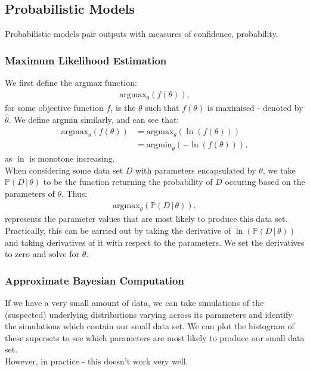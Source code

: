 \newpage

\subsection{Probabilistic Models}

Probabilistic models pair outputs with measures of confidence,
probability.

\subsubsection{Maximum Likelihood Estimation}

We first define the argmax function:
\begin{gather*}
    \text{argmax}_\theta(f(\theta)),
\end{gather*} for some objective function $f$, is the $\theta$
such that $f(\theta)$ is maximised - denoted by $\hat\theta$.
We define argmin similarly, and can see that:
\begin{align*}
    \text{argmax}_\theta(f(\theta)) 
    &= \text{argmax}_\theta(\ln(f(\theta))) \\
    &= \text{argmin}_\theta(-\ln(f(\theta))),
\end{align*} as $\ln$ is monotone increasing.
\\[\baselineskip]
When considering some data set $D$ with parameters
encapsulated by $\theta$, we take $\mathbb{P}(D \, | \, \theta)$ 
to be the function returning the probability of $D$ occuring based 
on the parameters of $\theta$. Thus: \begin{gather*}
    \text{argmax}_\theta(\mathbb{P}(D \, | \, \theta)),
\end{gather*} represents the parameter values that
are most likely to produce this data set. Practically,
this can be carried out by taking the derivative of
$\ln(\mathbb{P}(D \, | \, \theta))$ and taking derivatives 
of it with respect to the parameters. We set the derivatives
to zero and solve for $\theta$.

\subsubsection{Approximate Bayesian Computation}

If we have a very small amount of data, we can take simulations
of the (suspected) underlying distributions varying across its
parameters and identify the simulations which contain our small
data set. We can plot the histogram of these supersets to see
which parameters are most likely to produce our small data set.
\\[\baselineskip]
However, in practice - this doesn't work very well.

